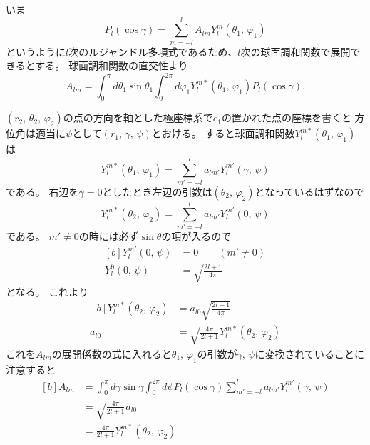 \documentclass[../master.tex]{subfiles}
\begin{document}
いま
\begin{equation}
	P_l(\cos\gamma) = \sum_{m=-l}^{l} A_{lm}Y_l^m(\theta_1,\,\varphi_1)
\end{equation}
というように\(l\)次のルジャンドル多項式であるため、\(l\)次の球面調和関数で展開できるとする。%
球面調和関数の直交性より
\begin{equation}
	A_{lm} = \int_{0}^{\pi} d\theta_1 \sin\theta_1 \int_{0}^{2\pi} d\varphi_1 Y_l^{m*}(\theta_1,\,\varphi_1) P_l(\cos\gamma).
\end{equation}

\((r_2,\,\theta_2,\,\varphi_2)\)の点の方向を軸とした極座標系で\(e_1\)の置かれた点の座標を書くと
方位角は適当に\(\psi\)として\((r_1,\,\gamma,\,\psi)\)とおける。
すると球面調和関数\(Y_l^{m*}(\theta_1,\,\varphi_1)\)は
\begin{equation}
	Y_l^{m*}(\theta_1,\,\varphi_1) = \sum_{m'=-l}^{l} a_{lm'}Y_l^{m'}(\gamma,\,\psi)
\end{equation}
である。
右辺を\(\gamma=0\)としたとき左辺の引数は\((\theta_2,\,\varphi_2)\)となっているはずなので
\begin{equation}
	Y_l^{m*}(\theta_2,\,\varphi_2) = \sum_{m'=-l}^{l} a_{lm'}Y_l^{m'}(0,\,\psi)
\end{equation}
である。
\(m'\neq0\)の時には必ず\(\sin\theta\)の項が入るので
\begin{equation}\begin{aligned}[b]
    Y_l^{m'}(0,\,\psi) &= 0 \qquad (m'\neq 0) \\
	Y_l^{0}(0,\,\psi) &= \sqrt{\frac{2l+1}{4\pi}}
\end{aligned}\end{equation}
となる。
これより
\begin{equation}\begin{aligned}[b]
    Y_l^{m*}(\theta_2,\,\varphi_2) &= a_{l0}\sqrt{\frac{2l+1}{4\pi}}\\
	a_{l0}& = \sqrt{\frac{4\pi}{2l+1}} Y_l^{m*}(\theta_2,\,\varphi_2)
\end{aligned}\end{equation}
これを\(A_{lm}\)の展開係数の式に入れると\(\theta_1,\,\varphi_1\)の引数が\(\gamma,\,\psi\)に変換されていることに注意すると
\begin{equation}\begin{aligned}[b]
    A_{lm} &=\int_{0}^{\pi} d\gamma \sin\gamma \int_{0}^{2\pi} d\psi
	P_l(\cos\gamma)\sum_{m'=-l}^{l}a_{lm'}Y_l^{m'}(\gamma,\,\psi)\\
	&=\sqrt{\frac{4\pi}{2l+1}}a_{l0}\\
	&=\frac{4\pi}{2l+1}Y_l^{m*}(\theta_2,\,\varphi_2)
\end{aligned}\end{equation}
\end{document}
